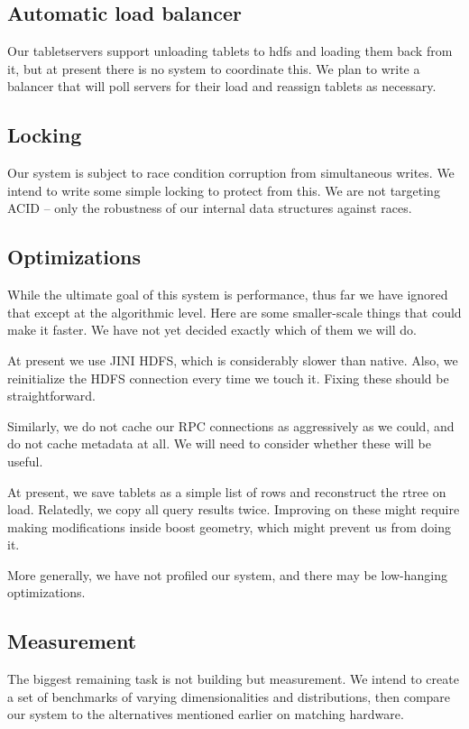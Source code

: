 \documentclass[11pt]{article}
\begin{document}
\subsection{Automatic load balancer}

Our tabletservers support unloading tablets to hdfs and loading them back from it, but at present there is no system to coordinate this. We plan to write a balancer that will poll servers for their load and reassign tablets as necessary.

\subsection{Locking}

Our system is subject to race condition corruption from simultaneous writes. We intend to write some simple locking to protect from this. We are not targeting ACID -- only the robustness of our internal data structures against races.

\subsection{Optimizations}

While the ultimate goal of this system is performance, thus far we have ignored that except at the algorithmic level. Here are some smaller-scale things that could make it faster. We have not yet decided exactly which of them we will do.


At present we use JINI HDFS, which is considerably slower than native. Also, we reinitialize the HDFS connection every time we touch it. Fixing these should be straightforward.

Similarly, we do not cache our RPC connections as aggressively as we could, and do not cache metadata at all. We will need to consider whether these will be useful.

At present, we save tablets as a simple list of rows and reconstruct the rtree on load. Relatedly, we copy all query results twice. Improving on these might require making modifications inside boost geometry, which might prevent us from doing it.

More generally, we have not profiled our system, and there may be low-hanging optimizations.

\subsection{Measurement}

The biggest remaining task is not building but measurement. We intend to create a set of benchmarks of varying dimensionalities and distributions, then compare our system to the alternatives mentioned earlier on matching hardware.
\end{document}
